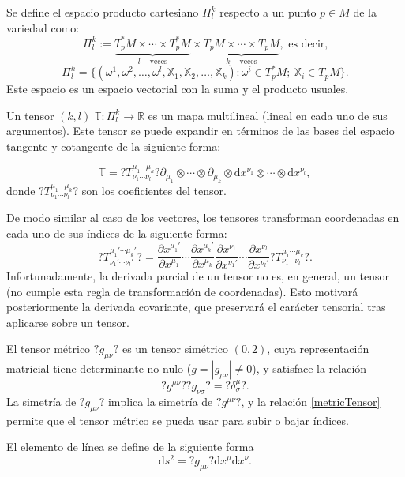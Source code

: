 \begin{defi}
	Se define el espacio producto cartesiano $\Pi_l^k$ respecto a un punto $p\in M$ de la variedad como:
	$$\Pi_l^k:=\underbrace{T^*_pM\times\cdots\times T^*_pM}_{l-\text{veces}}\times \underbrace{T_pM\times\cdots\times T_pM}_{k-\text{veces}}, \text{ es decir,}$$
	$$\Pi_l^k=\{(\omega^1,\omega^2,\dots,\omega^l,\mathds{X}_1,\mathds{X}_2,\dots,\mathds{X}_k): \omega^i\in T^*_pM; \ \mathds{X}_i\in T_pM\}.$$
	Este espacio es un espacio vectorial con la suma y el producto usuales.
\end{defi}
\begin{defi}[Tensores]
	Un tensor $(k,l)$ $\mathds{T}:\Pi_l^k\rightarrow \mathbb{R}$ es un mapa multilineal (lineal en cada uno de sus argumentos). Este tensor se puede expandir en términos de las bases del espacio tangente y cotangente de la siguiente forma:
	
	$$\mathds{T}=?{T}^{\mu_1\cdots\mu_k}_{\nu_1\cdots{\nu_l}}? \partial_{\mu_1}\otimes \cdots\otimes \partial_{\mu_k}\otimes \mathrm{d}x^{\nu_1}\otimes\cdots\otimes \mathrm{d}x^{\nu_l},$$
	donde $?{T}^{\mu_1\cdots\mu_k}_{\nu_1\cdots{\nu_l}}?$ son los coeficientes del tensor.
\end{defi}
De modo similar al caso de los vectores, los tensores transforman coordenadas en cada uno de sus índices de la siguiente forma:
$$?T^{\mu_1'\cdots\mu_k'}_{\nu_1'\cdots\nu_l'}?=\frac{\partial x^{\mu_1'}}{\partial x^{\mu_1}}\cdots\frac{\partial x^{\mu_k'}}{\partial x^{\mu_k}}\frac{\partial x^{\nu_1}}{\partial x^{\nu_1'}}\cdots \frac{\partial x^{\nu_l}}{\partial x^{\nu_l'}}?{T}^{\mu_1\cdots\mu_k}_{\nu_1\cdots{\nu_l}}?.$$
Infortunadamente, la derivada parcial de un tensor no es, en general, un tensor (no cumple esta regla de transformación de coordenadas). Esto motivará posteriormente la derivada covariante, que preservará el carácter tensorial tras aplicarse sobre un tensor.

\begin{defi}
	El tensor métrico $?g_{\mu\nu}?$ es un tensor simétrico $(0,2)$, cuya representación matricial tiene determinante no nulo ($g=|g_{\mu\nu}|\neq0$), y satisface la relación
	\begin{equation}\label{metricTensor}
		?g^{\mu\nu}? ?g_{\nu\sigma}?= ?\delta^\mu_\sigma?.
	\end{equation}
	La simetría de $?g_{\mu\nu}?$ implica la simetría de $?g^{\mu\nu}?$, y la relación \eqref{metricTensor} permite que el tensor métrico se pueda usar para subir o bajar índices.
\end{defi}
\begin{defi}
	El elemento de línea se define de la siguiente forma
	$$\mathrm{d}s^2=?g_{\mu\nu}? \mathrm{d}x^\mu \mathrm{d}x^\nu.$$
\end{defi}
